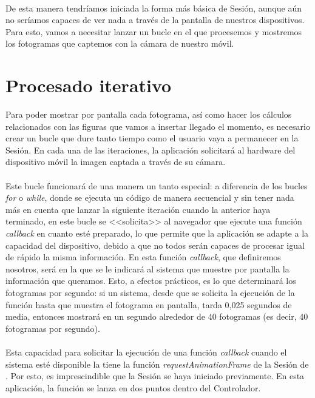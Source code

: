 \documentclass{subfiles}
\begin{document}
        \paragraph{}
        De esta manera tendríamos iniciada la forma más básica de Sesión, aunque aún no seríamos capaces de ver nada a través de la pantalla de nuestros dispositivos. Para esto, vamos a necesitar lanzar un bucle en el que procesemos y mostremos los fotogramas que captemos con la cámara de nuestro móvil.
        
        \section{Procesado iterativo}
        \label{sec:procesado_iterativo}

        Para poder mostrar por pantalla cada fotograma, así como hacer los cálculos relacionados con las figuras que vamos a insertar llegado el momento, es necesario crear un bucle que dure tanto tiempo como el usuario vaya a permanecer en la Sesión. En cada una de las iteraciones, la aplicación solicitará al hardware del dispositivo móvil la imagen captada a través de su cámara.

        \paragraph{}
        Este bucle funcionará de una manera un tanto especial: a diferencia de los bucles \textit{for} o \textit{while}, donde se ejecuta un código de manera secuencial y sin tener nada más en cuenta que lanzar la siguiente iteración cuando la anterior haya terminado, en este bucle se <<solicita>> al navegador que ejecute una función \textit{callback} en cuanto esté preparado, lo que permite que la aplicación se adapte a la capacidad del dispositivo, debido a que no todos serán capaces de procesar igual de rápido la misma información. En esta función \textit{callback}, que definiremos nosotros, será en la que se le indicará al sistema que muestre por pantalla la información que queramos. Esto, a efectos prácticos, es lo que determinará los fotogramas por segundo: si un sistema, desde que se solicita la ejecución de la función hasta que muestra el fotograma en pantalla, tarda 0,025 segundos de media, entonces mostrará en un segundo alrededor de 40 fotogramas (es decir, 40 fotogramas por segundo).

        \paragraph{}
        Esta capacidad para solicitar la ejecución de una función \textit{callback} cuando el sistema esté disponible la tiene la función \textit{requestAnimationFrame} de la Sesión de \webxr \cite{web:requestanimationframe}. Por esto, es imprescindible que la Sesión se haya iniciado previamente. En esta aplicación, la función se lanza en dos puntos dentro del Controlador.
\end{document}
